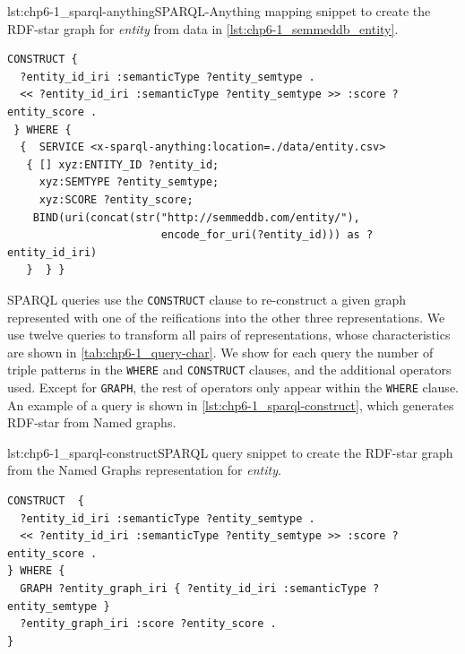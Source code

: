 \noindent\begin{captionedlisting}{lst:chp6-1_sparql-anything}{SPARQL-Anything mapping snippet to create the RDF-star graph for \textit{entity} from data in \cref{lst:chp6-1_semmeddb_entity}.  }
\centering
{
\begin{lstlisting}[basicstyle=\ttfamily\small,label={list:example1},columns=flexible,language=sparql]
CONSTRUCT {
  ?entity_id_iri :semanticType ?entity_semtype .
  << ?entity_id_iri :semanticType ?entity_semtype >> :score ?entity_score .
 } WHERE {
  {  SERVICE <x-sparql-anything:location=./data/entity.csv>
   { [] xyz:ENTITY_ID ?entity_id;
     xyz:SEMTYPE ?entity_semtype;
     xyz:SCORE ?entity_score;
    BIND(uri(concat(str("http://semmeddb.com/entity/"),
                        encode_for_uri(?entity_id))) as ?entity_id_iri)
   }  } }

\end{lstlisting}
}
\end{captionedlisting}



SPARQL queries use the \texttt{CONSTRUCT} clause to re-construct a given graph represented with one of the reifications into the other three representations. We use twelve queries to transform all pairs of representations, whose characteristics are shown in \cref{tab:chp6-1_query-char}. We show for each query the number of triple patterns in the \texttt{WHERE} and \texttt{CONSTRUCT} clauses, and the additional operators used. Except for \texttt{GRAPH}, the rest of operators only appear within the \texttt{WHERE} clause. An example of a query is shown in \cref{lst:chp6-1_sparql-construct}, which generates RDF-star from Named graphs.


\noindent\begin{captionedlisting}{lst:chp6-1_sparql-construct}{SPARQL query snippet to create the RDF-star graph from the Named Graphs representation for \textit{entity}. }
\centering
{
\begin{lstlisting}[basicstyle=\ttfamily\small,label={list:example1},columns=flexible,language=sparql]
CONSTRUCT  {
  ?entity_id_iri :semanticType ?entity_semtype .
  << ?entity_id_iri :semanticType ?entity_semtype >> :score ?entity_score .
} WHERE {
  GRAPH ?entity_graph_iri { ?entity_id_iri :semanticType ?entity_semtype }
  ?entity_graph_iri :score ?entity_score . 
}
\end{lstlisting}
}
\end{captionedlisting}



